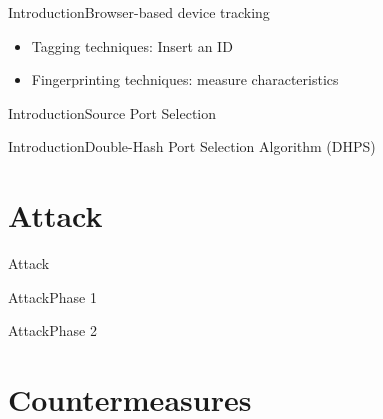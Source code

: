 \documentclass[aspectratio=169, hyperref={colorlinks=true, allcolors=SecondaryColor}, c]{beamer}
\begin{document}
\begin{frame}[fragile]{Introduction}{Browser-based device tracking}
	\begin{itemize}
		\item \alert{Tagging techniques:} Insert an ID
		\item \alert{Fingerprinting techniques:} measure characteristics
	\end{itemize}
\end{frame}

\begin{frame}[fragile]{Introduction}{Source Port Selection}
\end{frame}

\begin{frame}[fragile]{Introduction}{Double-Hash Port Selection Algorithm (DHPS)}
	\begin{center}
		\begin{adjustbox}{scale=0.7}
			
		\end{adjustbox}
	\end{center}
\end{frame}

\section{Attack}

\begin{frame}[fragile]{Attack}{}
\end{frame}

\begin{frame}[fragile]{Attack}{Phase 1}
	\begin{center}
		\begin{adjustbox}{scale=0.7}
			
		\end{adjustbox}
	\end{center}
\end{frame}

\begin{frame}[fragile]{Attack}{Phase 2}
	\begin{center}
		\begin{adjustbox}{scale=0.7}
			
		\end{adjustbox}
	\end{center}
\end{frame}

\section{Countermeasures}
\end{document}
